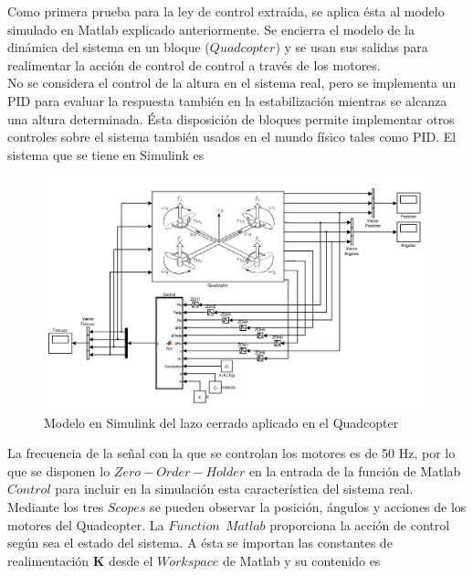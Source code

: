 \documentclass[twoside,11pt]{book}
\begin{document}
Como primera prueba para la ley de control extraída, se aplica ésta al modelo simulado en Matlab explicado anteriormente. Se encierra el modelo de la dinámica del sistema en un bloque ($Quadcopter$) y se usan sus salidas para realimentar la acción de control de control a través de los motores. \\

No se considera el control de la altura en el sistema real, pero se implementa un PID para evaluar la respuesta también en la estabilización mientras se alcanza una altura determinada. Ésta disposición de bloques permite implementar otros controles sobre el sistema también usados en el mundo físico tales como PID. El sistema que se tiene en Simulink es

\newpage

\begin{center}
\begin{figure}[h!]
\includegraphics[scale=0.43,bb=0 0 650 600]{images/Simulink_model_2.png}
\caption{Modelo en Simulink del lazo cerrado aplicado en el Quadcopter}
\end{figure}
\end{center}

La frecuencia de la señal con la que se controlan los motores es de 50 Hz, por lo que se disponen lo $Zero-Order-Holder$ en la entrada de la función de Matlab $Control$ para incluir en la simulación esta característica del sistema real.\\ 
Mediante los tres $Scopes$ se pueden observar la posición, ángulos y acciones de los motores del Quadcopter. La $Function \>\> Matlab$ proporciona la acción de control según sea el estado del sistema. A ésta se importan las constantes de realimentación $\mathbf{K}$ desde el $Workspace$ de Matlab y su contenido es
\end{document}
